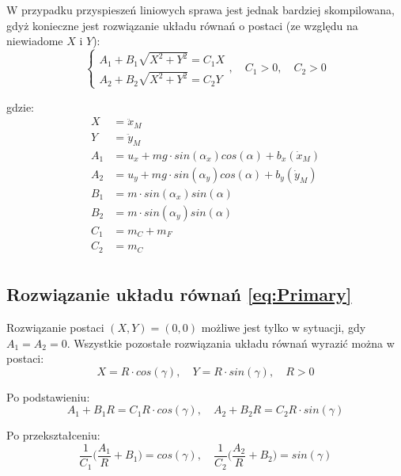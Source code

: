 \documentclass[10pt]{article}
\begin{document}
W przypadku przyspieszeń liniowych sprawa jest jednak bardziej skompilowana, gdyż konieczne jest rozwiązanie układu równań o postaci (ze względu na niewiadome $X$ i $Y$):
\begin{equation}
\begin{cases}
A_1+B_1\sqrt{X^2 + Y^2} = C_1X \\ 
A_2+B_2\sqrt{X^2 + Y^2} = C_2Y
\end{cases}, \quad C_1 > 0, \quad C_2 > 0
\label{eq:Primary}
\end{equation}

gdzie:
\begin{equation*}
\begin{split}
X &= \ddot{x}_M \\
Y &= \ddot{y}_M \\
A_1 &= u_x + mg \cdot sin(\alpha_x)cos(\alpha) + b_x(\dot{x}_M) \\
A_2 &= u_y + mg \cdot sin(\alpha_y)cos(\alpha) + b_y(\dot{y}_M) \\
B_1 &= m \cdot sin(\alpha_x) sin(\alpha) \\
B_2 &= m \cdot sin(\alpha_y) sin(\alpha) \\
C_1 &= m_C + m_F \\
C_2 &= m_C \\
\end{split}
\end{equation*}

\subsection*{Rozwiązanie układu równań \eqref{eq:Primary}}
Rozwiązanie postaci $(X,Y) = (0,0)$ możliwe jest tylko w sytuacji, gdy $A_1 = A_2 = 0$. Wszystkie pozostałe rozwiązania układu równań wyrazić można w postaci:
\begin{equation}
X = R \cdot cos(\gamma), \quad Y = R \cdot sin(\gamma), \quad R > 0
\end{equation}

Po podstawieniu:
\begin{equation}
A_1 + B_1 R = C_1 R \cdot cos(\gamma), \quad
A_2 + B_2 R = C_2 R \cdot sin(\gamma)
\end{equation}

Po przekształceniu:
\begin{equation}
\frac{1}{C_1} \Big( \frac{A_1}{R} + B_1 \Big) = cos(\gamma), \quad
\frac{1}{C_2} \Big( \frac{A_2}{R} + B_2 \Big) = sin(\gamma)
\end{equation}
\end{document}
